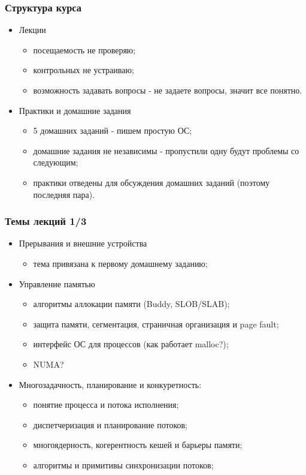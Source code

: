 \begin{frame}
\frametitle{Структура курса}
\begin{itemize}
  \item Лекции
  \begin{itemize}
    \item посещаемость не проверяю;
    \item контрольных не устраиваю;
    \item возможность задавать вопросы - не задаете вопросы, значит все понятно.
  \end{itemize}
  \item Практики и домашние задания
  \begin{itemize}
    \item 5 домашних заданий - пишем простую ОС;
    \item домашние задания не независимы - пропустили одну будут проблемы со
    следующим;
    \item практики отведены для обсуждения домашних заданий (поэтому последняя
    пара).
  \end{itemize}
\end{itemize}
\end{frame}

\begin{frame}
\frametitle{Темы лекций 1/3}
\begin{itemize}
  \item Прерывания и внешние устройства
  \begin{itemize}
    \item тема привязана к первому домашнему заданию;
  \end{itemize}
  \item Управление памятью
  \begin{itemize}
    \item алгоритмы аллокации памяти (Buddy, SLOB/SLAB);
    \item защита памяти, сегментация, страничная организация и page fault;
    \item интерфейс ОС для процессов (как работает malloc?);
    \item NUMA?
  \end{itemize}
  \item Многозадачность, планирование и конкуретность:
  \begin{itemize}
    \item понятие процесса и потока исполнения;
    \item диспетчеризация и планирование потоков;
    \item многоядерность, когерентность кешей и барьеры памяти;
    \item алгоритмы и примитивы синхронизации потоков;
  \end{itemize}
\end{itemize}
\end{frame}

